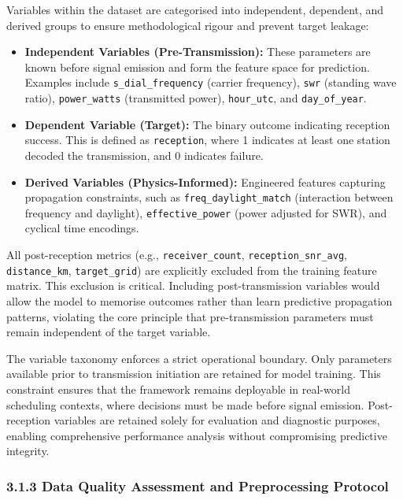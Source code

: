 Variables within the dataset are categorised into independent,
dependent, and derived groups to ensure methodological rigour and
prevent target leakage:

\begin{itemize}
\tightlist
\item
  \textbf{Independent Variables (Pre-Transmission):} These parameters
  are known before signal emission and form the feature space for
  prediction. Examples include \texttt{s\_dial\_frequency} (carrier
  frequency), \texttt{swr} (standing wave ratio), \texttt{power\_watts}
  (transmitted power), \texttt{hour\_utc}, and \texttt{day\_of\_year}.
\item
  \textbf{Dependent Variable (Target):} The binary outcome indicating
  reception success. This is defined as \texttt{reception}, where 1
  indicates at least one station decoded the transmission, and 0
  indicates failure.
\item
  \textbf{Derived Variables (Physics-Informed):} Engineered features
  capturing propagation constraints, such as
  \texttt{freq\_daylight\_match} (interaction between frequency and
  daylight), \texttt{effective\_power} (power adjusted for SWR), and
  cyclical time encodings.
\end{itemize}

All post-reception metrics (e.g., \texttt{receiver\_count},
\texttt{reception\_snr\_avg}, \texttt{distance\_km},
\texttt{target\_grid}) are explicitly excluded from the training feature
matrix. This exclusion is critical. Including post-transmission
variables would allow the model to memorise outcomes rather than learn
predictive propagation patterns, violating the core principle that
pre-transmission parameters must remain independent of the target
variable.

The variable taxonomy enforces a strict operational boundary. Only
parameters available prior to transmission initiation are retained for
model training. This constraint ensures that the framework remains
deployable in real-world scheduling contexts, where decisions must be
made before signal emission. Post-reception variables are retained
solely for evaluation and diagnostic purposes, enabling comprehensive
performance analysis without compromising predictive integrity.

\subsubsection{3.1.3 Data Quality Assessment and Preprocessing
Protocol}\label{data-quality-assessment-and-preprocessing-protocol}

